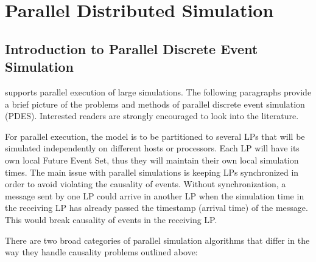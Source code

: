 \chapter{Parallel Distributed Simulation}
\label{cha:parallel-execution}


\section{Introduction to Parallel Discrete Event Simulation}

{\opp} supports parallel execution of large
simulations. The following paragraphs provide a brief picture
of the problems and methods of parallel
discrete event simulation (PDES). Interested readers are
strongly encouraged to look into the literature.

For parallel execution, the model is to be partitioned to several
LPs that will be simulated independently on different hosts or
processors. Each LP will have its own local Future Event Set,
thus they will maintain their own local simulation times. The main issue with
parallel simulations is keeping LPs synchronized in order to
avoid violating the causality of events. Without synchronization, a
message sent by one LP could arrive in another LP when the
simulation time in the receiving LP has already passed the
timestamp (arrival time) of the message. This would break
causality of events in the receiving LP.

There are two broad categories of parallel simulation algorithms
that differ in the way they handle causality problems outlined
above:

